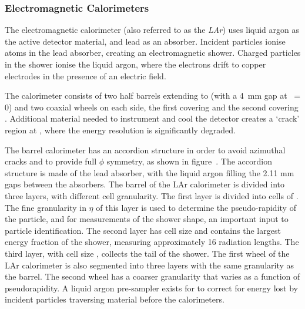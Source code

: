 \subsubsection{Electromagnetic Calorimeters}

The electromagnetic calorimeter (also referred to as the {\it LAr}) uses liquid
argon as the active detector material, and lead as an absorber. Incident
particles ionise atoms in the lead absorber, creating an electromagnetic shower.
Charged particles in the shower ionise the liquid argon, where the electrons
drift to copper electrodes in the presence of an electric field.

The calorimeter consists of two half barrels extending to  (with
a 4~mm gap at \z\ = 0) and two coaxial wheels on each side, the first covering
 and the second covering .
Additional material needed to instrument and cool the detector creates a `crack'
region at , where the energy resolution is
significantly degraded.

The barrel calorimeter has an accordion structure in order to avoid azimuthal
cracks and to provide full $\phi$ symmetry, as shown in
figure~. The accordion structure is made of
the lead absorber, with the liquid argon filling the 2.11 mm gaps between the
absorbers. The barrel of the LAr calorimeter is divided into three layers, with
different cell granularity. The first layer is divided into cells of 
. The fine granularity in $\eta$ of this layer
is used to determine the pseudo-rapidity of the particle, and for measurements
of the shower shape, an important input to particle identification. The
second layer has cell size  and contains the
largest energy fraction of the shower, measuring approximately 16 radiation 
lengths. The third layer, with cell size , collects
the tail of the shower. The first wheel of the LAr calorimeter is also segmented into
three layers with the same granularity as the barrel. The second wheel has a
coarser granularity that varies as a function of pseudorapidity. A liquid argon
pre-sampler exists for  to correct for energy lost by incident
particles traversing material before the calorimeters.


